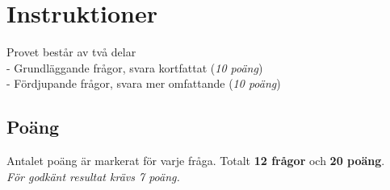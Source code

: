 \documentclass{exam}
\begin{document}
\section*{Instruktioner}
Provet består av två delar \\
    - Grundläggande frågor, svara kortfattat (\textit{10 poäng})\\
    - Fördjupande frågor, svara mer omfattande (\textit{10 poäng})

\subsection*{Poäng}
Antalet poäng är markerat för varje fråga. Totalt \textbf{12 frågor} och \textbf{20 poäng}.\\ \textit{För godkänt resultat krävs 7 poäng.}
\end{document}

